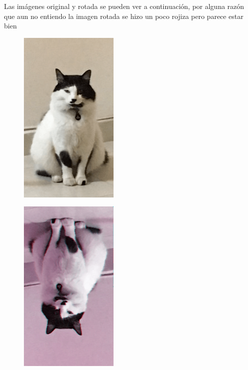 \documentclass[12pt,a4paper]{article}
\begin{document}
\begin{enumerate}
    Las imágenes original y rotada se pueden ver a continuación, por alguna razón que aun no entiendo la imagen rotada se hizo un poco rojiza pero parece estar bien
    
    \begin{figure}[h]
        \centering
        \includegraphics[scale=1]{gato.png}
    \end{figure}
    
    \begin{figure}[h]
        \centering
        \includegraphics[scale=1]{gatorot.png}
    \end{figure}
\end{enumerate}
\end{document}
